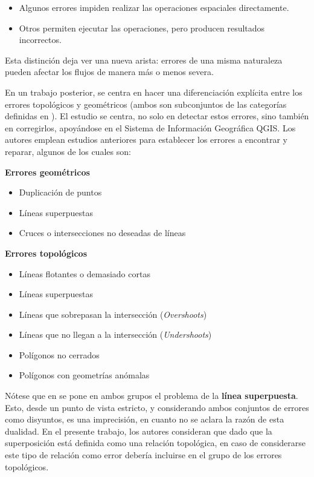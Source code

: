 \begin{itemize}
	\item Algunos errores impiden realizar las operaciones espaciales directamente.
	\item Otros permiten ejecutar las operaciones, pero producen resultados incorrectos.
\end{itemize}

Esta distinción deja ver una nueva arista: errores de una misma naturaleza pueden afectar los flujos de manera más o menos severa.

En un trabajo posterior, \cite{kukulska_methodology_2018} se centra en hacer una diferenciación explícita entre los errores topológicos y geométricos (ambos son subconjuntos de las categorías definidas en \cite{servigne_methodology_2000}). El estudio se centra, no solo en detectar estos errores, sino también en corregirlos, apoyándose en el Sistema de Información Geográfica QGIS. Los autores emplean estudios anteriores para establecer los errores a encontrar y reparar, algunos de los cuales son:

\textbf{Errores geométricos}

\begin{itemize}[leftmargin=1.5em]
	\item Duplicación de puntos
	\item Líneas superpuestas
	\item Cruces o intersecciones no deseadas de líneas
\end{itemize}

\textbf{Errores topológicos}

\begin{itemize}[leftmargin=1.5em]
	\item Líneas flotantes o demasiado cortas
	\item Líneas superpuestas
	\item Líneas que sobrepasan la intersección (\emph{Overshoots})
	\item Líneas que no llegan a la intersección (\emph{Undershoots})
	\item Polígonos no cerrados
	\item Polígonos con geometrías anómalas
\end{itemize}

Nótese que en \cite{kukulska_methodology_2018} se pone en ambos grupos el problema de la \textbf{línea superpuesta}. Esto, desde un punto de vista estricto, y considerando ambos conjuntos de errores como disyuntos, es una imprecisión, en cuanto no se aclara la razón de esta dualidad. En el presente trabajo, los autores consideran que dado que la superposición está definida como una relación topológica, en caso de considerarse este tipo de relación como error debería incluirse en el grupo de los errores topológicos.

